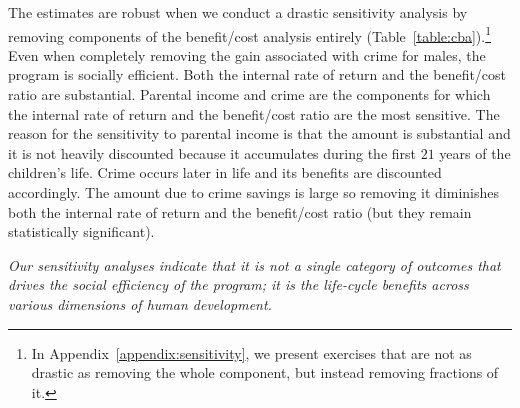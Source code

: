 The estimates are robust when we conduct a drastic sensitivity analysis by removing components of the benefit/cost analysis entirely (Table~\ref{table:cba}).\footnote{In Appendix~\ref{appendix:sensitivity}, we present exercises that are not as drastic as removing the whole component, but instead removing fractions of it.} Even when completely removing the gain associated with crime for males, the program is socially efficient. Both the internal rate of return and the benefit/cost ratio are substantial. Parental income and crime are the components for which the internal rate of return and the benefit/cost ratio are the most sensitive. The reason for the sensitivity to parental income is that the amount is substantial and it is not heavily discounted because it accumulates during the first $21$ years of the children's life. Crime occurs later in life and its benefits are discounted accordingly. The amount due to crime savings is large so removing it diminishes both the internal rate of return and the benefit/cost ratio (but they remain statistically significant).

\textit{Our sensitivity analyses indicate that it is not a single category of outcomes that drives the social efficiency of the program; it is the life-cycle benefits across various dimensions of human development.}

